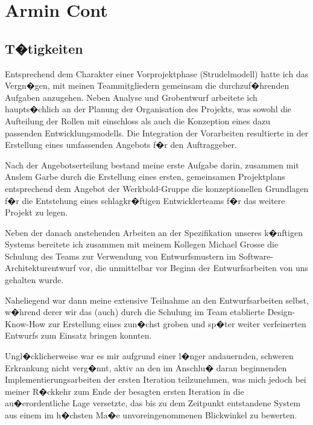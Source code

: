 \section{Armin Cont}


\subsection{T�tigkeiten}

Entsprechend dem Charakter einer Vorprojektphase (Strudelmodell) hatte ich das
Vergn�gen, mit meinen Teammitgliedern gemeinsam die durchzuf�hrenden Aufgaben 
anzugehen. Neben Analyse und Grobentwurf arbeitete ich haupts�chlich an der 
Planung der Organisation des Projekts, was sowohl die Aufteilung der Rollen 
mit einschloss als auch die Konzeption eines dazu passenden Entwicklungsmodells.
Die Integration der Vorarbeiten resultierte in der Erstellung eines umfassenden
Angebots f�r den Auftraggeber.\par

Nach der Angebotserteilung bestand meine erste Aufgabe darin, zusammen mit Anslem
Garbe durch die Erstellung eines ersten, gemeinsamen Projektplans entsprechend dem 
Angebot der Werkbold-Gruppe die konzeptionellen Grundlagen f�r die Entstehung eines 
schlagkr�ftigen Entwicklerteams f�r das weitere Projekt zu legen.\par

Neben der danach anstehenden Arbeiten an der Spezifikation unseres k�nftigen Systems 
bereitete ich zusammen mit meinem Kollegen Michael Grosse die Schulung des Teams zur
Verwendung von Entwurfsmustern im Software-Architekturentwurf vor, die unmittelbar vor 
Beginn der Entwurfsarbeiten von uns gehalten wurde.\par

Naheliegend war dann meine extensive Teilnahme an den Entwurfsarbeiten selbst, w�hrend 
derer wir das (auch) durch die Schulung im Team etablierte Design-Know-How zur Erstellung eines
zun�chst groben und sp�ter weiter verfeinerten Entwurfs zum Einsatz bringen konnten.\par

Ungl�cklicherweise war es mir aufgrund einer l�nger andauernden, schweren Erkrankung nicht verg�nnt,
aktiv an den im Anschlu� daran beginnenden Implementierungsarbeiten der ersten Iteration teilzunehmen,
was mich jedoch bei meiner R�ckkehr zum Ende der besagten ersten Iteration in die au�erordentliche Lage
versetzte, das bis zu dem Zeitpunkt entstandene System aus einem im h�chsten Ma�e unvoreingenommenen
Blickwinkel zu bewerten.\par

